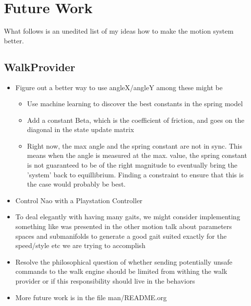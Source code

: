 \documentclass[11pt]{article}
\begin{document}
\section{Future Work}
What follows is an unedited list of my ideas how to make the motion system better.
\subsection{WalkProvider}
\begin{itemize}
\item Figure out a better way to use angleX/angleY among these might be
\begin{itemize}
   \item Use machine learning to discover the best constants in the spring model
   \item Add a constant Beta, which is the coefficient of friction, and goes on
      the diagonal in the state update matrix
   \item Right now, the max angle and the spring constant are not in sync. This
      means when the angle is measured at the max. value, the spring constant
      is not guaranteed to be of the right magnitude to eventually bring the
      'system' back to equillibrium.  Finding a constraint to ensure that this
      is the case would probably be best.
\end{itemize}
\item Control Nao with a Playstation Controller
\item To deal elegantly with having many gaits, we might consider implementing something
like was presented in the other motion talk about parameters spaces and submanifolds to
generate a good gait suited exactly for the speed/style etc we are trying to accomplish
\item Resolve the philosophical question of whether sending potentially unsafe
   commands to the walk engine should be limited from withing the walk provider
   or if this responsibility should live in the behaviors
\item More future work is in the file man/README.org
\end{itemize}
\end{document}
